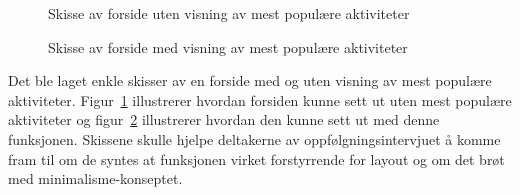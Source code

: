 \begin{figure}[H]
\caption{Skisse av forside uten visning av mest populære aktiviteter}
\label{fig:utenMestPopulaere}
\end{figure}

\begin{figure}[H]
\caption{Skisse av forside med visning av mest populære aktiviteter}
\label{fig:medMestPopulaere}
\end{figure}

Det ble laget enkle skisser av en forside med og uten visning av mest populære aktiviteter. Figur~\ref{fig:utenMestPopulaere} illustrerer hvordan forsiden kunne sett ut uten mest populære aktiviteter og figur~\ref{fig:medMestPopulaere} illustrerer hvordan den kunne sett ut med denne funksjonen. Skissene skulle hjelpe deltakerne av oppfølgningsintervjuet å komme fram til om de syntes at funksjonen virket forstyrrende for layout og om det brøt med minimalisme-konseptet.

